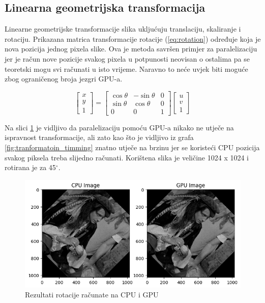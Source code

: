 \documentclass[a4paper,twocolumn]{article}
\begin{document}
        \subsection{Linearna geometrijska transformacija}

        Linearne geometrijske transformacije slika ukljućuju translaciju, skaliranje i rotaciju. Prikazana matrica transformacije rotacije (\ref{eq:rotation}) određuje koja je nova pozicija jednog pixela slike. Ova je metoda savršen primjer za paralelizaciju jer je račun nove pozicije svakog pixela u potpunosti neovisan o ostalima pa se teoretski mogu svi računati u isto vrijeme. Naravno to neće uvjek biti moguće zbog ograničenog broja jezgri GPU-a.
        
               \begin{equation}
                    \begin{bmatrix}
                    x \\
                    y \\
                    1
                    \end{bmatrix}
                    =
                    \begin{bmatrix}
                    \cos \theta & -\sin \theta & 0 \\
                    \sin \theta & \cos \theta & 0 \\
                    0 & 0 & 1
                    \end{bmatrix}
                    \begin{bmatrix}
                    u \\
                    v \\
                    1
                    \end{bmatrix}
                    \label{eq:rotation}
                \end{equation}

        Na slici \ref{fig:rotation_results} je vidljivo da paralelizaciju pomoću GPU-a nikako ne utječe na ispravnost transformacije, ali zato kao što je vidljivo iz grafa \ref{fig:tranformatoin_timming} znatno utječe na brzinu jer se koristeći CPU pozicija svakog piksela treba slijedno računati. Korištena slika je veličine 1024 x 1024 i rotirana je za 45$^\circ$.

        \begin{figure}[H]
		\centering
		\includegraphics[width=0.9\linewidth]{slike/img_tranformation_results.png} 
		\caption{Rezultati rotacije računate na CPU i GPU}
		\label{fig:rotation_results}
	\end{figure} 
\end{document}

